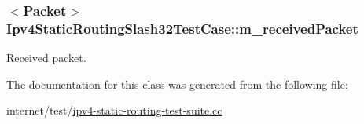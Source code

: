 \subsubsection[{\texorpdfstring{m\+\_\+received\+Packet}{m_receivedPacket}}]{$<${\bf Packet}$>$ Ipv4\+Static\+Routing\+Slash32\+Test\+Case\+::m\+\_\+received\+Packet}\hypertarget{classIpv4StaticRoutingSlash32TestCase_aaf03ac38a3bf02e523e19255b641f1d4}{}\label{classIpv4StaticRoutingSlash32TestCase_aaf03ac38a3bf02e523e19255b641f1d4}


Received packet. 



The documentation for this class was generated from the following file\+:\begin{DoxyCompactItemize}
\item 
internet/test/\hyperlink{ipv4-static-routing-test-suite_8cc}{ipv4-\/static-\/routing-\/test-\/suite.\+cc}\end{DoxyCompactItemize}
